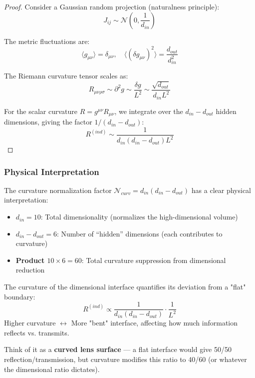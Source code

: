 \begin{proof}
Consider a Gaussian random projection (naturalness principle):
\begin{equation}
    J_{ij} \sim \mathcal{N}\left(0, \frac{1}{d_{in}}\right)
\end{equation}

The metric fluctuations are:
\begin{equation}
    \langle g_{\mu\nu} \rangle = \delta_{\mu\nu}, \quad \langle (\delta g_{\mu\nu})^2 \rangle = \frac{d_{out}}{d_{in}^2}
\end{equation}

The Riemann curvature tensor scales as:
\begin{equation}
    R_{\mu\nu\rho\sigma} \sim \partial^2 g \sim \frac{\delta g}{L^2} \sim \frac{\sqrt{d_{out}}}{d_{in} L^2}
\end{equation}

For the scalar curvature $R = g^{\mu\nu} R_{\mu\nu}$, we integrate over the $d_{in} - d_{out}$ hidden dimensions, giving the factor $1/(d_{in} - d_{out})$:
\begin{equation}
    R^{(ind)} \sim \frac{1}{d_{in}(d_{in} - d_{out}) L^2}
\end{equation}
\end{proof}

\subsubsection{Physical Interpretation}

The curvature normalization factor $\mathcal{N}_{curv} = d_{in}(d_{in} - d_{out})$ has a clear physical interpretation:

\begin{itemize}
    \item \textbf{$d_{in} = 10$}: Total dimensionality (normalizes the high-dimensional volume)
    \item \textbf{$d_{in} - d_{out} = 6$}: Number of ``hidden'' dimensions (each contributes to curvature)
    \item \textbf{Product $10 \times 6 = 60$}: Total curvature suppression from dimensional reduction
\end{itemize}

\begin{insight}
The curvature of the dimensional interface quantifies its deviation from a "flat" boundary:
\begin{equation}
    R^{(ind)} \propto \frac{1}{d_{in}(d_{in} - d_{out})} \cdot \frac{1}{L^2}
\end{equation}
Higher curvature $\leftrightarrow$ More "bent" interface, affecting how much information reflects vs. transmits.

Think of it as a \textbf{curved lens surface} — a flat interface would give 50/50 reflection/transmission, but curvature modifies this ratio to 40/60 (or whatever the dimensional ratio dictates).
\end{insight}

